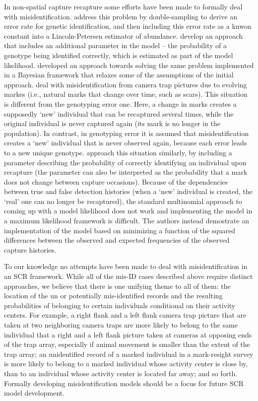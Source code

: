 In non-spatial capture recapture some efforts have been made to formally deal with misidentification. \citet{stevick_etal:2001} address this problem by double-sampling to derive an error rate for genetic identification, and then including this error rate as a knwon constant into a Lincoln-Petersen estimator of abundance. \citet{lukacs_burnham:2005} develop an approach that includes an additional parameter in the model -- the probability of a genotype being identified correctly, which is estimated as part of the model likelihood. \citet{link_etal:2010} developed an approach towards solving the same problem implemented in a Bayesian framework that relaxes some of the assumptions of the initial approach.
\citet{yoshizaki_etal:2009} deal with misidentification from camera trap pictures due to evolving markes (i.e., natural marks that change over time, such as scars). This situation is different from the genotyping error one. Here, a change in marks creates a supposedly `new' individual that can be recaptured several times, while the original individual is never captured again (its mark is no longer in the population). In contrast, in genotyping error it is assumed that misidentification creates a `new' individual that is never observed again, because each error leads to a new unique genotype. \citet{yoshizaki_etal:2009} approach this situation similarly, by including a parameter describing the probability of correctly identifying an individual upon recapture (the parameter can also be interpreted as the probability that a mark does not change between capture occasions). Because of the dependencies between true and false detection histories (when a `new' individual is created, the `real' one can no longer be recaptured), the standard multinomial approach to coming up with a model likelihood does not work and implementing the model in a maximum likelihood framework is difficult. The authors instead demostrate an implementation of the model based on minimizing a function of the squared differences between the observed and expected frequencies of the observed capture histories. 

To our knowledge no attempts have been made to deal with misidentification in an SCR framework. While all of the mis-ID cases described above require distinct approaches, we believe that there is one unifying theme to all of them: the location of the un or potentially mis-identified records and the resulting probabilities of belonging to certain individuals conditional on their activity centers. For example, a right flank and a left flank camera trap picture that are taken at two neighboring camera traps are more likely to belong to the same individual that a right and a left flank picture taken at cameras at opposing ends of the trap array, especially if animal movement is smaller than the extent of the trap array; an unidentified record of a marked individual in a mark-resight survey is more likely to belong to a marked individual whose activity center is close by, than to an individual whose activity center is located far away; and so forth. Formally developing misidentification models should be a focus for future SCR model development. 

